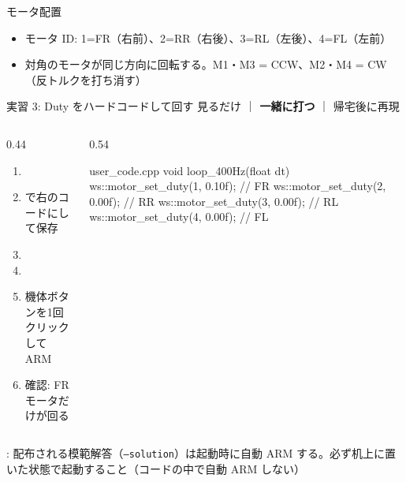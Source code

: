 \begin{frame}{モータ配置}
  \begin{center}
    \resizebox{0.4\textwidth}{!}{}
  \end{center}
  \begin{itemize}\small
    \item モータ ID: 1=FR（右前）、2=RR（右後）、3=RL（左後）、4=FL（左前）
    \item 対角のモータが同じ方向に回転する。M1・M3 = CCW、M2・M4 = CW（反トルクを打ち消す）
  \end{itemize}
\end{frame}

\begin{frame}[fragile]{実習 3: Duty をハードコードして回す}
  \vspace{0.15em}
  {\small 見るだけ ｜ \textcolor{sfblue}{\textbf{一緒に打つ}} ｜ 帰宅後に再現}
  \vspace{0.15em}

  \begin{columns}[T]
    \begin{column}{0.44\textwidth}
      \footnotesize
      \begin{enumerate}\setlength{\itemsep}{1pt}
        \item {}
        \item {} で右のコードにして保存
        \item {}
        \item {}
        \item 機体ボタンを1回クリックして ARM
        \item 確認: FR モータだけが回る
      \end{enumerate}
    \end{column}
    \begin{column}{0.54\textwidth}
      \begin{sflisting}[basicstyle=\ttfamily\scriptsize]{user\_code.cpp}
void loop_400Hz(float dt) {
    ws::motor_set_duty(1, 0.10f);   // FR
    ws::motor_set_duty(2, 0.00f);   // RR
    ws::motor_set_duty(3, 0.00f);   // RL
    ws::motor_set_duty(4, 0.00f);   // FL
}
      \end{sflisting}
    \end{column}
  \end{columns}

  \vspace{0.15em}

  {\footnotesize {}: 配布される模範解答（\texttt{--solution}）は起動時に自動 ARM する。必ず机上に置いた状態で起動すること（コードの中で自動 ARM しない）}
\end{frame}

